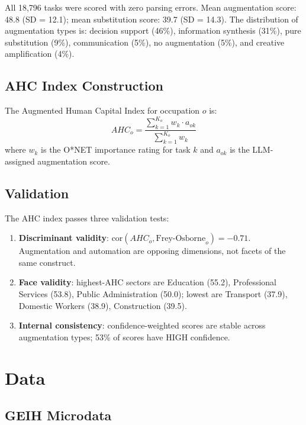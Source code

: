\documentclass[a4paper,fleqn]{cas-dc}
\begin{document}
All 18,796 tasks were scored with zero parsing errors. Mean augmentation score: 48.8 (SD = 12.1); mean substitution score: 39.7 (SD = 14.3). The distribution of augmentation types is: decision support (46\%), information synthesis (31\%), pure substitution (9\%), communication (5\%), no augmentation (5\%), and creative amplification (4\%).

\subsection{AHC Index Construction}

The Augmented Human Capital Index for occupation $o$ is:
\begin{equation}
AHC_o = \frac{\sum_{k=1}^{K_o} w_k \cdot a_{ok}}{\sum_{k=1}^{K_o} w_k}
\label{eq:ahc}
\end{equation}
where $w_k$ is the O*NET importance rating for task $k$ and $a_{ok}$ is the LLM-assigned augmentation score.

\subsection{Validation}

The AHC index passes three validation tests:
\begin{enumerate}
\item \textbf{Discriminant validity}: $\text{cor}(AHC_o, \text{Frey-Osborne}_o) = -0.71$. Augmentation and automation are opposing dimensions, not facets of the same construct.
\item \textbf{Face validity}: highest-AHC sectors are Education (55.2), Professional Services (53.8), Public Administration (50.0); lowest are Transport (37.9), Domestic Workers (38.9), Construction (39.5).
\item \textbf{Internal consistency}: confidence-weighted scores are stable across augmentation types; 53\% of scores have HIGH confidence.
\end{enumerate}


\section{Data}
\label{sec:data}

\subsection{GEIH Microdata}
\end{document}

